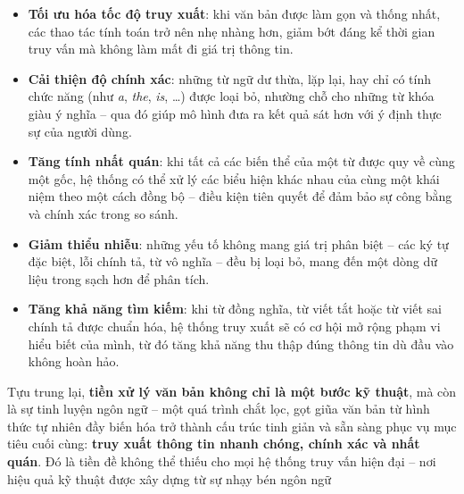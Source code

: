 \begin{itemize}
    \item \textbf{Tối ưu hóa tốc độ truy xuất}: khi văn bản được làm gọn và thống nhất, các thao tác tính toán trở nên nhẹ nhàng hơn, giảm bớt đáng kể thời gian truy vấn mà không làm mất đi giá trị thông tin.
    \item \textbf{Cải thiện độ chính xác}: những từ ngữ dư thừa, lặp lại, hay chỉ có tính chức năng (như \textit{a}, \textit{the}, \textit{is}, \dots) được loại bỏ, nhường chỗ cho những từ khóa giàu ý nghĩa -- qua đó giúp mô hình đưa ra kết quả sát hơn với ý định thực sự của người dùng.
    \item \textbf{Tăng tính nhất quán}: khi tất cả các biến thể của một từ được quy về cùng một gốc, hệ thống có thể xử lý các biểu hiện khác nhau của cùng một khái niệm theo một cách đồng bộ -- điều kiện tiên quyết để đảm bảo sự công bằng và chính xác trong so sánh.
    \item \textbf{Giảm thiểu nhiễu}: những yếu tố không mang giá trị phân biệt -- các ký tự đặc biệt, lỗi chính tả, từ vô nghĩa -- đều bị loại bỏ, mang đến một dòng dữ liệu trong sạch hơn để phân tích.
    \item \textbf{Tăng khả năng tìm kiếm}: khi từ đồng nghĩa, từ viết tắt hoặc từ viết sai chính tả được chuẩn hóa, hệ thống truy xuất sẽ có cơ hội mở rộng phạm vi hiểu biết của mình, từ đó tăng khả năng thu thập đúng thông tin dù đầu vào không hoàn hảo.
\end{itemize}

Tựu trung lại, \textbf{tiền xử lý văn bản không chỉ là một bước kỹ thuật}, mà còn là sự tinh luyện ngôn ngữ -- một quá trình chắt lọc, gọt giũa văn bản từ hình thức tự nhiên đầy biến hóa trở thành cấu trúc tinh giản và sẵn sàng phục vụ mục tiêu cuối cùng: \textbf{truy xuất thông tin nhanh chóng, chính xác và nhất quán}. Đó là tiền đề không thể thiếu cho mọi hệ thống truy vấn hiện đại -- nơi hiệu quả kỹ thuật được xây dựng từ sự nhạy bén ngôn ngữ
